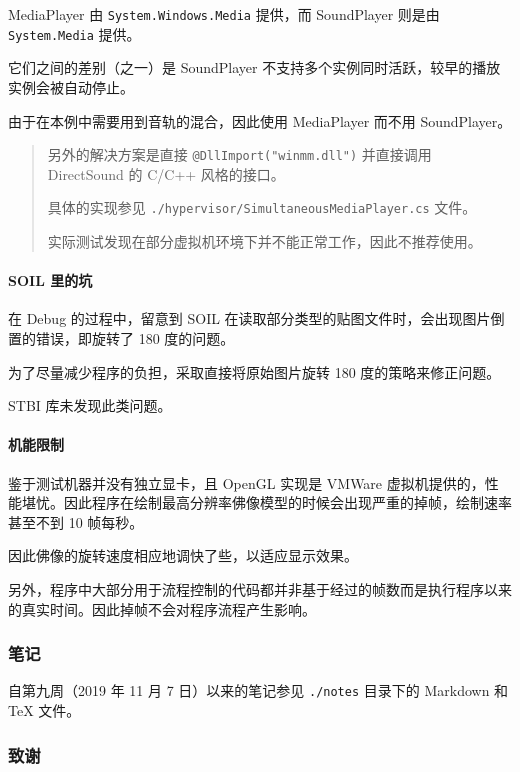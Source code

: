 \documentclass[
]{article}
\begin{document}
MediaPlayer 由 \texttt{System.Windows.Media} 提供，而 SoundPlayer 则是由
\texttt{System.Media} 提供。

它们之间的差别（之一）是 SoundPlayer
不支持多个实例同时活跃，较早的播放实例会被自动停止。

由于在本例中需要用到音轨的混合，因此使用 MediaPlayer 而不用
SoundPlayer。

\begin{quote}
另外的解决方案是直接 \texttt{@DllImport("winmm.dll")} 并直接调用
DirectSound 的 C/C++ 风格的接口。

具体的实现参见 \texttt{./hypervisor/SimultaneousMediaPlayer.cs} 文件。

实际测试发现在部分虚拟机环境下并不能正常工作，因此不推荐使用。
\end{quote}

\hypertarget{header-n286}{%
\paragraph{SOIL 里的坑}\label{header-n286}}

在 Debug 的过程中，留意到 SOIL
在读取部分类型的贴图文件时，会出现图片倒置的错误，即旋转了 180
度的问题。

为了尽量减少程序的负担，采取直接将原始图片旋转 180 度的策略来修正问题。

STBI 库未发现此类问题。

\hypertarget{header-n290}{%
\paragraph{机能限制}\label{header-n290}}

鉴于测试机器并没有独立显卡，且 OpenGL 实现是 VMWare
虚拟机提供的，性能堪忧。因此程序在绘制最高分辨率佛像模型的时候会出现严重的掉帧，绘制速率甚至不到
10 帧每秒。

因此佛像的旋转速度相应地调快了些，以适应显示效果。

另外，程序中大部分用于流程控制的代码都并非基于经过的帧数而是执行程序以来的真实时间。因此掉帧不会对程序流程产生影响。

\hypertarget{header-n294}{%
\subsubsection{笔记}\label{header-n294}}

自第九周（2019 年 11 月 7 日）以来的笔记参见 \texttt{./notes} 目录下的
Markdown 和 TeX 文件。

\hypertarget{header-n296}{%
\subsubsection{致谢}\label{header-n296}}
\end{document}
